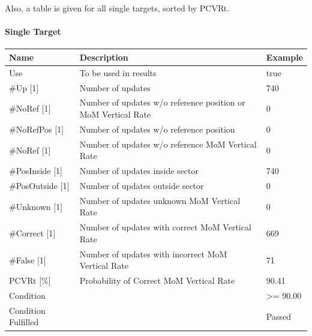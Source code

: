 Also, a table is given for all single targets, sorted by PCVRt.

\paragraph{Single Target}

\begin{center}
 \begin{table}[H]
  \begin{tabularx}{\textwidth}{ | l | X |  l | }
    \hline
    \textbf{Name} & \textbf{Description} & \textbf{Example} \\ \hline
    Use & To be used in results & true \\ \hline
    \#Up [1] & Number of updates & 740 \\ \hline
    \#NoRef [1] & Number of updates w/o reference position or MoM Vertical Rate & 0 \\ \hline
    \#NoRefPos [1] & Number of updates w/o reference position  & 0 \\ \hline
    \#NoRef [1] & Number of updates w/o reference MoM Vertical Rate & 0 \\ \hline
    \#PosInside [1] & Number of updates inside sector & 740 \\ \hline
    \#PosOutside [1] & Number of updates outside sector & 0 \\ \hline
    \#Unknown [1] & Number of updates unknown MoM Vertical Rate & 0 \\ \hline
    \#Correct [1] & Number of updates with correct MoM Vertical Rate & 669 \\ \hline
    \#False [1] & Number of updates with incorrect MoM Vertical Rate & 71 \\ \hline
    PCVRt [\%] & Probability of Correct MoM Vertical Rate & 90.41 \\ \hline
    Condition &  & >= 90.00 \\ \hline
    Condition Fulfilled &  & Passed \\ \hline
\end{tabularx}
\end{table}
\end{center}

